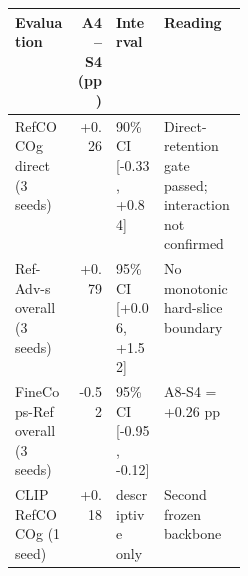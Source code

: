 \begin{tabular}{p{0.27\linewidth}rll}
\toprule
Evaluation & A4--S4 (pp) & Interval & Reading \\
\midrule
RefCOCOg direct (3 seeds) & +0.26 & 90\% CI [-0.33, +0.84] & Direct-retention gate passed; interaction not confirmed \\
Ref-Adv-s overall (3 seeds) & +0.79 & 95\% CI [+0.06, +1.52] & No monotonic hard-slice boundary \\
FineCops-Ref overall (3 seeds) & -0.52 & 95\% CI [-0.95, -0.12] & A8-S4 = +0.26 pp \\
CLIP RefCOCOg (1 seed) & +0.18 & descriptive only & Second frozen backbone \\
\bottomrule
\end{tabular}
